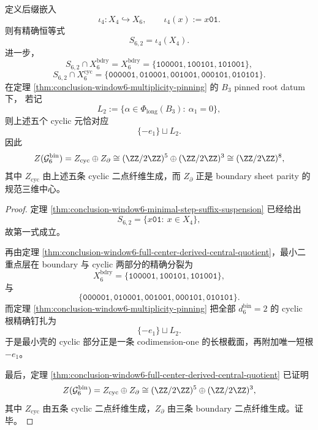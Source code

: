 \begin{theorem}\label{thm:conclusion-window6-minimal-shell-rigid-subcover-root-slice}
定义后缀嵌入
\[
\iota_4:X_4\hookrightarrow X_6,
\qquad
\iota_4(x):=x\mathtt{01}.
\]
则有精确恒等式
\[
S_{6,2}=\iota_4(X_4).
\]
进一步，
\[
S_{6,2}\cap X_6^{\mathrm{bdry}}
=
X_6^{\mathrm{bdry}}
=
\{\mathtt{100001},\mathtt{100101},\mathtt{101001}\},
\]
\[
S_{6,2}\cap X_6^{\mathrm{cyc}}
=
\{\mathtt{000001},\mathtt{010001},\mathtt{001001},\mathtt{000101},\mathtt{010101}\}.
\]
在定理 \ref{thm:conclusion-window6-multiplicity-pinning} 的 \(B_3\) pinned root datum 下，
若记
\[
L_2:=\{\alpha\in\Phi_{\mathrm{long}}(B_3):\ \alpha_1=0\},
\]
则上述五个 cyclic 元恰对应
\[
\{-e_1\}\sqcup L_2.
\]
因此
\[
Z(\mathcal G_6^{\mathrm{bin}})
=
Z_{\mathrm{cyc}}\oplus Z_{\partial}
\cong
(\ZZ/2\ZZ)^5\oplus(\ZZ/2\ZZ)^3
\cong
(\ZZ/2\ZZ)^8,
\]
其中 \(Z_{\mathrm{cyc}}\) 由上述五条 cyclic 二点纤维生成，而 \(Z_{\partial}\) 正是 boundary sheet parity 的规范三维中心。
\end{theorem}
\begin{proof}
定理 \ref{thm:conclusion-window6-minimal-step-suffix-suspension} 已经给出
\[
S_{6,2}=\{x\mathtt{01}:\ x\in X_4\},
\]
故第一式成立。

再由定理 \ref{thm:conclusion-window6-full-center-derived-central-quotient}，最小二重点层在 boundary 与 cyclic 两部分的精确分裂为
\[
X_6^{\mathrm{bdry}}
=
\{\mathtt{100001},\mathtt{100101},\mathtt{101001}\},
\]
与
\[
\{\mathtt{000001},\mathtt{010001},\mathtt{001001},\mathtt{000101},\mathtt{010101}\}.
\]
而定理 \ref{thm:conclusion-window6-multiplicity-pinning} 把全部 \(d_6^{\mathrm{bin}}=2\) 的 cyclic 根精确钉扎为
\[
\{-e_1\}\sqcup L_2.
\]
于是最小壳的 cyclic 部分正是一条 codimension-one 的长根截面，再附加唯一短根 \(-e_1\)。

最后，定理 \ref{thm:conclusion-window6-full-center-derived-central-quotient} 已证明
\[
Z(\mathcal G_6^{\mathrm{bin}})
=
Z_{\mathrm{cyc}}\oplus Z_{\partial}
\cong
(\ZZ/2\ZZ)^5\oplus(\ZZ/2\ZZ)^3,
\]
其中 \(Z_{\mathrm{cyc}}\) 由五条 cyclic 二点纤维生成，\(Z_{\partial}\) 由三条 boundary 二点纤维生成。证毕。
\end{proof}

